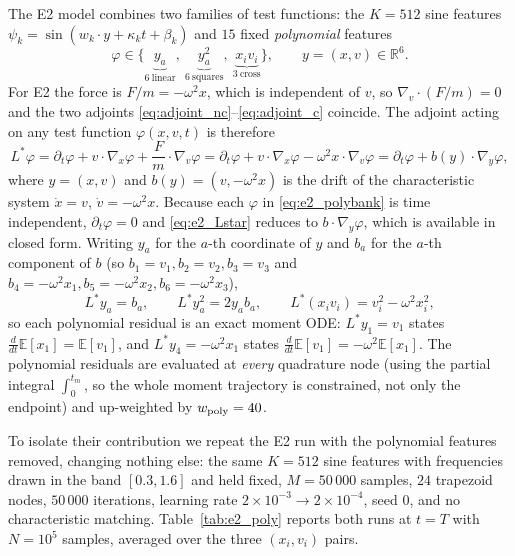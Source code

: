 \documentclass[11pt]{article}
\newcommand{\R}{\mathbb{R}}
\newcommand{\E}{\mathbb{E}}
\newcommand{\ph}{\varphi}
\theoremstyle{plain}
\begin{document}
The E2 model combines two families of test functions: the $K=512$ sine features
$\psi_k=\sin(w_k\cdot y+\kappa_k t+\beta_k)$ and $15$ fixed \emph{polynomial} features
\begin{equation}
\ph\in\{\underbrace{y_a}_{6\ \text{linear}},\ \underbrace{y_a^2}_{6\ \text{squares}},\ \underbrace{x_iv_i}_{3\ \text{cross}}\},
\qquad y=(x,v)\in\R^6 .
\label{eq:e2_polybank}
\end{equation}
For E2 the force is $F/m=-\omega^2x$, which is independent of $v$, so $\nabla_v\cdot(F/m)=0$ and the two adjoints
\eqref{eq:adjoint_nc}--\eqref{eq:adjoint_c} coincide. The adjoint acting on any test function $\ph(x,v,t)$ is therefore
\begin{equation}
L^*\ph
=\partial_t\ph+v\cdot\nabla_x\ph+\frac{F}{m}\cdot\nabla_v\ph
=\partial_t\ph+v\cdot\nabla_x\ph-\omega^2x\cdot\nabla_v\ph
=\partial_t\ph+b(y)\cdot\nabla_y\ph ,
\label{eq:e2_Lstar}
\end{equation}
where $y=(x,v)$ and $b(y)=(v,-\omega^2x)$ is the drift of the characteristic system $\dot x=v$, $\dot v=-\omega^2x$.
Because each $\ph$ in \eqref{eq:e2_polybank} is time independent, $\partial_t\ph=0$ and \eqref{eq:e2_Lstar} reduces to
$b\cdot\nabla_y\ph$, which is available in closed form. Writing $y_a$ for the $a$-th coordinate of $y$ and $b_a$ for
the $a$-th component of $b$ (so $b_1=v_1,b_2=v_2,b_3=v_3$ and $b_4=-\omega^2x_1,b_5=-\omega^2x_2,b_6=-\omega^2x_3$),
\begin{equation}
L^*y_a=b_a,\qquad L^*y_a^2=2y_ab_a,\qquad L^*(x_iv_i)=v_i^2-\omega^2x_i^2 ,
\label{eq:e2_Lstarpoly}
\end{equation}
so each polynomial residual is an exact moment ODE: $L^*y_1=v_1$ states
$\tfrac{d}{dt}\E[x_1]=\E[v_1]$, and $L^*y_4=-\omega^2x_1$ states $\tfrac{d}{dt}\E[v_1]=-\omega^2\E[x_1]$. The polynomial residuals are evaluated at \emph{every} quadrature node (using the partial
integral $\int_0^{t_m}$, so the whole moment trajectory is constrained, not only the endpoint) and up-weighted by
$w_{\rm poly}=40$.

To isolate their contribution we repeat the E2 run with the polynomial features removed, changing nothing else: the
same $K=512$ sine features with frequencies drawn in the band $[0.3,1.6]$ and held fixed, $M=50\,000$ samples, $24$
trapezoid nodes, $50\,000$ iterations, learning rate $2\times10^{-3}\to2\times10^{-4}$, seed $0$, and no characteristic
matching. Table~\ref{tab:e2_poly} reports both runs at $t=T$ with $N=10^5$ samples, averaged over the three
$(x_i,v_i)$ pairs.
\end{document}
